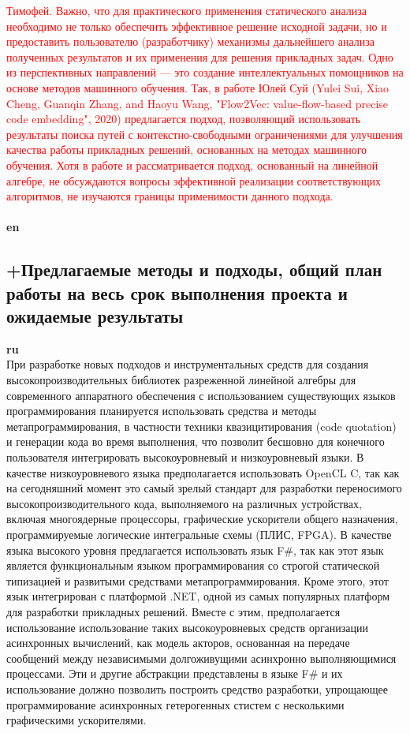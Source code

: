 \documentclass[12pt]{article}  %
\theoremstyle{remark}
\newcommand{\checkme}[1]{\textcolor{red}{#1}}
\begin{document}
\checkme{Тимофей. Важно, что для практического применения статического анализа необходимо не только обеспечить эффективное решение исходной задачи, но и предоставить пользователю (разработчику) механизмы дальнейшего анализа полученных результатов и их применения для решения прикладных задач. Одно из перспективных направлений --- это создание интеллектуальных помощников на основе методов машинного обучения. Так, в работе Юлей Суй (Yulei Sui, Xiao Cheng, Guanqin Zhang, and Haoyu Wang, "Flow2Vec: value-flow-based precise code embedding", 2020) предлагается подход, позволяющий использовать результаты поиска путей с контекстно-свободными ограничениями для улучшения качества работы прикладных решений, основанных на методах машинного обучения. Хотя в работе и рассматривается подход, основанный на линейной алгебре, не обсуждаются вопросы эффективной реализации соответствующих алгоритмов, не изучаются границы применимости данного подхода.}
\\
\\
\textbf{en}\\


\subsection{+Предлагаемые методы и подходы, общий план работы на весь срок выполнения проекта и ожидаемые результаты }

\textbf{ru}\\

При разработке новых подходов и инструментальных средств для создания высокопроизводительных библиотек разреженной линейной алгебры для современного аппаратного обеспечения с использованием существующих языков программирования планируется использовать средства и методы метапрограммирования, в частности техники квазицитирования (code quotation) и генерации кода во время выполнения, что позволит бесшовно для конечного пользователя интегрировать высокоуровневый и низкоуровневый языки. В качестве низкоуровневого языка предполагается использовать OpenCL C, так как на сегодняшний момент это самый зрелый стандарт для разработки переносимого высокопроизводительного кода, выполняемого на различных устройствах, включая многоядерные процессоры, графические ускорители общего назначения, программируемые логические интегральные схемы (ПЛИС, FPGA). В качестве языка высокого уровня предлагается использовать язык F\#, так как этот язык является функциональным языком программирования со строгой статической типизацией и развитыми средствами метапрограммирования. Кроме этого, этот язык интегрирован с платформой .NET, одной из самых популярных платформ для разработки прикладных решений. Вместе с этим, предполагается использование использование таких высокоуровневых средств организации асинхронных вычислений, как модель акторов, основанная на передаче сообщений между независимыми долгоживущими асинхронно выполняющимися процессами. Эти и другие абстракции представлены в языке F\# и их использование должно позволить построить средство разработки, упрощающее программирование асинхронных гетерогенных стистем с несколькими графическими ускорителями.
\end{document}
